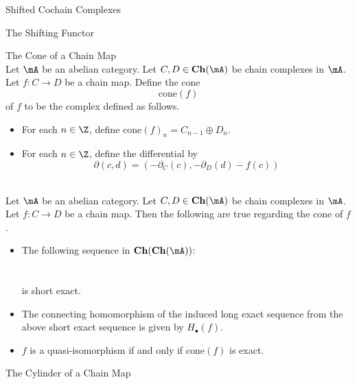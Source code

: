 \documentclass[a4paper]{article}
\begin{document}
\begin{defn}{Shifted Cochain Complexes}{}
\end{defn}

\begin{defn}{The Shifting Functor}{}
\end{defn}

\begin{defn}{The Cone of a Chain Map}{}\\
Let $\mA$ be an abelian category. Let $C,D\in\bold{Ch}(\mA)$ be chain complexes in $\mA$. Let $f:C\to D$ be a chain map. Define the cone $$\text{cone}(f)$$ of $f$ to be the complex defined as follows. 
\begin{itemize}
\item For each $n\in\Z$, define $\text{cone}(f)_n=C_{n-1}\oplus D_n$. 
\item For each $n\in\Z$, define the differential by $$\partial(c,d)=(-\partial_C(c),-\partial_D(d)-f(c))$$
\end{itemize}
\end{defn}

\begin{prp}{}{}\\
Let $\mA$ be an abelian category. Let $C,D\in\bold{Ch}(\mA)$ be chain complexes in $\mA$. Let $f:C\to D$ be a chain map. Then the following are true regarding the cone of $f$. 
\begin{itemize}
\item The following sequence in $\bold{Ch}(\bold{Ch}(\mA))$: \\
\\~\\
is short exact. 
\item The connecting homomorphism of the induced long exact sequence from the above short exact sequence is given by $H_\bullet(f)$. 
\item $f$ is a quasi-isomorphism if and only if $\text{cone}(f)$ is exact. 
\end{itemize}
\end{prp}

\begin{defn}{The Cylinder of a Chain Map}{}
\end{defn}
\end{document}
